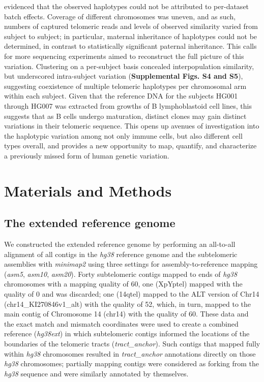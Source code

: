 \documentclass{article}
\begin{document}
        evidenced that the observed haplotypes could not be attributed to per-dataset batch effects.
    Coverage of different chromosomes was uneven,
        and as such, numbers of captured telomeric reads and levels of observed similarity varied from subject to subject;
        in particular, maternal inheritance of haplotypes could not be determined, in contrast to statistically significant paternal inheritance.
        This calls for more sequencing experiments aimed to reconstruct the full picture of this variation.
    Clustering on a per-subject basis concealed interpopulation similarity,
        but underscored intra-subject variation (\textbf{Supplemental Figs. S4 and S5}),
            suggesting coexistence of multiple telomeric haplotypes per chromosomal arm within each subject.
        Given that the reference DNA for the subjects HG001 through HG007
            was extracted from growths of B lymphoblastoid cell lines,
            this suggests that as B cells undergo maturation,
                distinct clones may gain distinct variations in their telomeric sequence.
        This opens up avenues of investigation into the haplotypic variation among not only immune cells,
            but also different cell types overall,
            and provides a new opportunity to map, quantify, and characterize a previously missed form of human genetic variation.

\section*{Materials and Methods}  \label{sec:methods}

\subsection*{The extended reference genome}
    We constructed the extended reference genome by performing an all-to-all alignment
        of all contigs in the \textit{hg38} reference genome \parencite{grch38,hg38}
        and the subtelomeric assemblies \parencite{riethman2014}
        with \textit{minimap2} \parencite{minimap} using three settings
            for assembly-to-reference mapping (\textit{asm5}, \textit{asm10}, \textit{asm20}).
    Forty subtelomeric contigs mapped to ends of \textit{hg38} chromosomes with a mapping quality of 60,
        one (XpYptel) mapped with the quality of 0 and was discarded;
        one (14qtel) mapped to the ALT version of Chr14 (chr14\_KI270846v1\_alt) with the quality of 52,
            which, in turn, mapped to the main contig of Chromosome 14 (chr14) with the quality of 60.
    These data and the exact match and mismatch coordinates were used to create a combined reference (\textit{hg38ext})
        in which subtelomeric contigs informed the locations of the boundaries of the telomeric tracts (\textit{tract\_anchor}).
    Such contigs that mapped fully within \textit{hg38} chromosomes resulted in \textit{tract\_anchor} annotations
            directly on those \textit{hg38} chromosomes;
        partially mapping contigs were considered as forking from the \textit{hg38} sequence and were similarly annotated by themselves.
\end{document}
